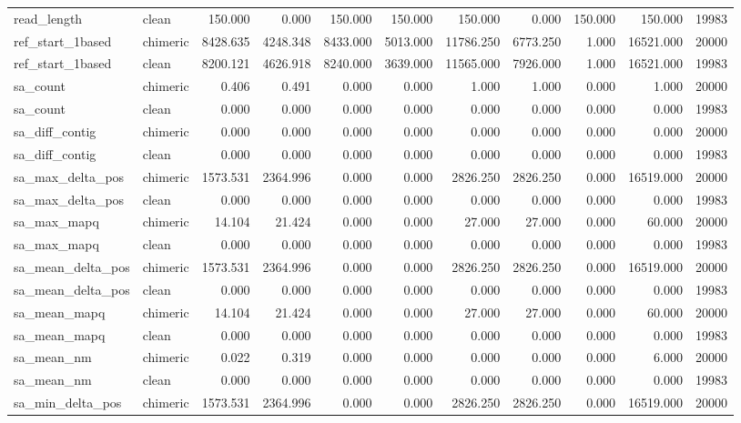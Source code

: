 \begin{landscape}
\begin{center}
\begin{longtable}{llrrrrrrrrr}
read\_length & clean & 150.000 & 0.000 & 150.000 & 150.000 & 150.000 & 0.000 & 150.000 & 150.000 & 19983 \\
ref\_start\_1based & chimeric & 8428.635 & 4248.348 & 8433.000 & 5013.000 & 11786.250 & 6773.250 & 1.000 & 16521.000 & 20000 \\
ref\_start\_1based & clean & 8200.121 & 4626.918 & 8240.000 & 3639.000 & 11565.000 & 7926.000 & 1.000 & 16521.000 & 19983 \\
sa\_count & chimeric & 0.406 & 0.491 & 0.000 & 0.000 & 1.000 & 1.000 & 0.000 & 1.000 & 20000 \\
sa\_count & clean & 0.000 & 0.000 & 0.000 & 0.000 & 0.000 & 0.000 & 0.000 & 0.000 & 19983 \\
sa\_diff\_contig & chimeric & 0.000 & 0.000 & 0.000 & 0.000 & 0.000 & 0.000 & 0.000 & 0.000 & 20000 \\
sa\_diff\_contig & clean & 0.000 & 0.000 & 0.000 & 0.000 & 0.000 & 0.000 & 0.000 & 0.000 & 19983 \\
sa\_max\_delta\_pos & chimeric & 1573.531 & 2364.996 & 0.000 & 0.000 & 2826.250 & 2826.250 & 0.000 & 16519.000 & 20000 \\
sa\_max\_delta\_pos & clean & 0.000 & 0.000 & 0.000 & 0.000 & 0.000 & 0.000 & 0.000 & 0.000 & 19983 \\
sa\_max\_mapq & chimeric & 14.104 & 21.424 & 0.000 & 0.000 & 27.000 & 27.000 & 0.000 & 60.000 & 20000 \\
sa\_max\_mapq & clean & 0.000 & 0.000 & 0.000 & 0.000 & 0.000 & 0.000 & 0.000 & 0.000 & 19983 \\
sa\_mean\_delta\_pos & chimeric & 1573.531 & 2364.996 & 0.000 & 0.000 & 2826.250 & 2826.250 & 0.000 & 16519.000 & 20000 \\
sa\_mean\_delta\_pos & clean & 0.000 & 0.000 & 0.000 & 0.000 & 0.000 & 0.000 & 0.000 & 0.000 & 19983 \\
sa\_mean\_mapq & chimeric & 14.104 & 21.424 & 0.000 & 0.000 & 27.000 & 27.000 & 0.000 & 60.000 & 20000 \\
sa\_mean\_mapq & clean & 0.000 & 0.000 & 0.000 & 0.000 & 0.000 & 0.000 & 0.000 & 0.000 & 19983 \\
sa\_mean\_nm & chimeric & 0.022 & 0.319 & 0.000 & 0.000 & 0.000 & 0.000 & 0.000 & 6.000 & 20000 \\
sa\_mean\_nm & clean & 0.000 & 0.000 & 0.000 & 0.000 & 0.000 & 0.000 & 0.000 & 0.000 & 19983 \\
sa\_min\_delta\_pos & chimeric & 1573.531 & 2364.996 & 0.000 & 0.000 & 2826.250 & 2826.250 & 0.000 & 16519.000 & 20000 \\

\end{longtable}
\end{center}
\end{landscape}
